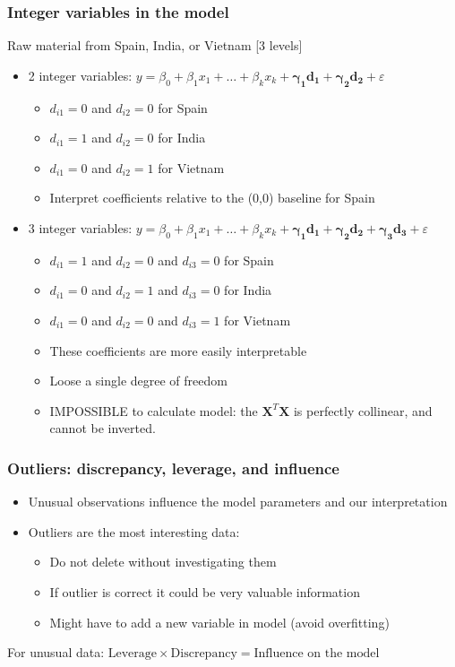 \begin{frame}\frametitle{Integer variables in the model}

	Raw material from Spain, India, or Vietnam [3 levels]
	\begin{itemize}
		\item	2 integer variables: $y = \beta_0 + \beta_1x_1 + \ldots + \beta_k x_k +\mathbf{ \gamma_1 d_1 + \gamma_2 d_2} + \varepsilon$
		\begin{itemize}
			\item	$d_{i1} = 0$ and $d_{i2} = 0$ for Spain
			\item	$d_{i1} = 1$ and $d_{i2} = 0$ for India
			\item	$d_{i1} = 0$ and $d_{i2} = 1$ for Vietnam
			\item	Interpret coefficients relative to the (0,0) baseline for Spain
		\end{itemize}
	\end{itemize}
	\begin{itemize}
		\item	3 integer variables: $y = \beta_0 + \beta_1x_1 + \ldots + \beta_k x_k + \mathbf{\gamma_1 d_1 + \gamma_2 d_2 + \gamma_3 d_3} + \varepsilon$
		\begin{itemize}
			\item	$d_{i1} = 1$ and $d_{i2} = 0$ and $d_{i3} = 0$ for Spain
			\item	$d_{i1} = 0$ and $d_{i2} = 1$ and $d_{i3} = 0$ for India
			\item	$d_{i1} = 0$ and $d_{i2} = 0$ and $d_{i3} = 1$ for Vietnam
			\item	These coefficients are more easily interpretable
			\item	Loose a single degree of freedom
			\item	IMPOSSIBLE to calculate model: the $\mathbf{X}^T\mathbf{X}$ is perfectly collinear, and cannot be inverted.
		\end{itemize}
	\end{itemize}
\end{frame}

\begin{frame}\frametitle{Outliers: discrepancy, leverage, and influence}
	\begin{itemize}
		\item	Unusual observations influence the model parameters and our interpretation
		\item	Outliers are the most interesting data:
		\begin{itemize}
			\item	Do not delete without investigating them
			\item	If outlier is correct it could be very valuable information
			\item	Might have to add a new variable in model (avoid overfitting)
		\end{itemize}
	\end{itemize}

	For unusual data: $\text{Leverage} \times \text{Discrepancy} = \text{Influence on the model} $
\end{frame}


